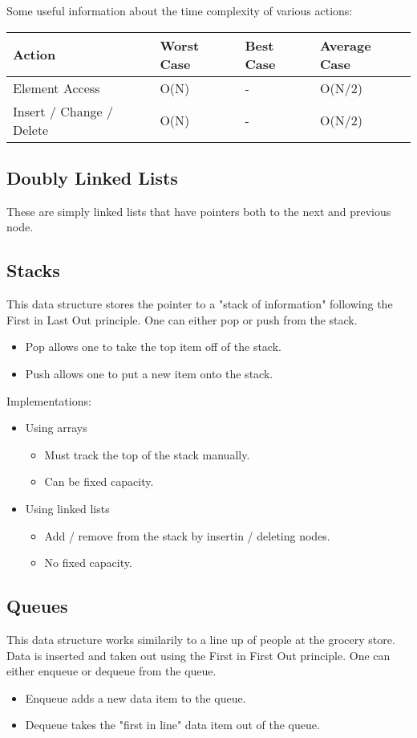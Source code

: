 \documentclass[11pt]{article}
\begin{document}
Some useful information about the time complexity of various actions:
\begin{center}
\begin{tabular}{llll}
Action & Worst Case & Best Case & Average Case\\
\hline
Element Access & O(N) & - & O(N/2)\\
Insert / Change / Delete & O(N) & - & O(N/2)\\
\end{tabular}
\end{center}

\subsection*{Doubly Linked Lists}
\label{sec:org3d42140}
These are simply linked lists that have pointers both to the next and previous node.

\subsection*{Stacks}
\label{sec:org25d8bcb}
This data structure stores the pointer to a "stack of information" following the First in Last Out principle.
One can either pop or push from the stack.
\begin{itemize}
\item Pop allows one to take the top item off of the stack.
\item Push allows one to put a new item onto the stack.
\end{itemize}

Implementations:
\begin{itemize}
\item Using arrays
\begin{itemize}
\item Must track the top of the stack manually.
\item Can be fixed capacity.
\end{itemize}
\item Using linked lists
\begin{itemize}
\item Add / remove from the stack by insertin / deleting nodes.
\item No fixed capacity.
\end{itemize}
\end{itemize}
\subsection*{Queues}
\label{sec:org72db4d0}
This data structure works similarily to a line up of people at the grocery store.
Data is inserted and taken out using the First in First Out principle.
One can either enqueue or dequeue from the queue.
\begin{itemize}
\item Enqueue adds a new data item to the queue.
\item Dequeue takes the "first in line" data item out of the queue.
\end{itemize}
\end{document}

